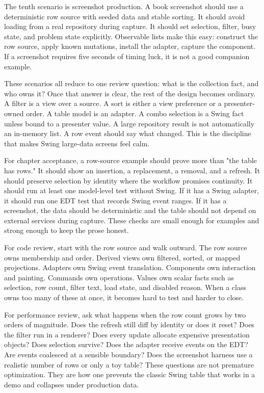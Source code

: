 The tenth scenario is screenshot production. A book screenshot should use a
deterministic row source with seeded data and stable sorting. It should avoid
loading from a real repository during capture. It should set selection, filter,
busy state, and problem state explicitly. Observable lists make this easy:
construct the row source, apply known mutations, install the adapter, capture
the component. If a screenshot requires five seconds of timing luck, it is not a
good companion example.

These scenarios all reduce to one review question: what is the collection fact,
and who owns it? Once that answer is clear, the rest of the design becomes
ordinary. A filter is a view over a source. A sort is either a view preference or
a presenter-owned order. A table model is an adapter. A combo selection is a
Swing fact unless bound to a presenter value. A large repository result is not
automatically an in-memory list. A row event should say what changed. This is the
discipline that makes Swing large-data screens feel calm.

For chapter acceptance, a row-source example should prove more than "the table
has rows." It should show an insertion, a replacement, a removal, and a refresh.
It should preserve selection by identity where the workflow promises continuity.
It should run at least one model-level test without Swing. If it has a Swing
adapter, it should run one EDT test that records Swing event ranges. If it has a
screenshot, the data should be deterministic and the table should not depend on
external services during capture. These checks are small enough for examples and
strong enough to keep the prose honest.

For code review, start with the row source and walk outward. The row source owns
membership and order. Derived views own filtered, sorted, or mapped projections.
Adapters own Swing event translation. Components own interaction and painting.
Commands own operations. Values own scalar facts such as selection, row count,
filter text, load state, and disabled reason. When a class owns too many of
these at once, it becomes hard to test and harder to close.

For performance review, ask what happens when the row count grows by two orders
of magnitude. Does the refresh still diff by identity or does it reset? Does the
filter run in a renderer? Does every update allocate expensive presentation
objects? Does selection survive? Does the adapter receive events on the EDT? Are
events coalesced at a sensible boundary? Does the screenshot harness use a
realistic number of rows or only a toy table? These questions are not premature
optimization. They are how one prevents the classic Swing table that works in a
demo and collapses under production data.


